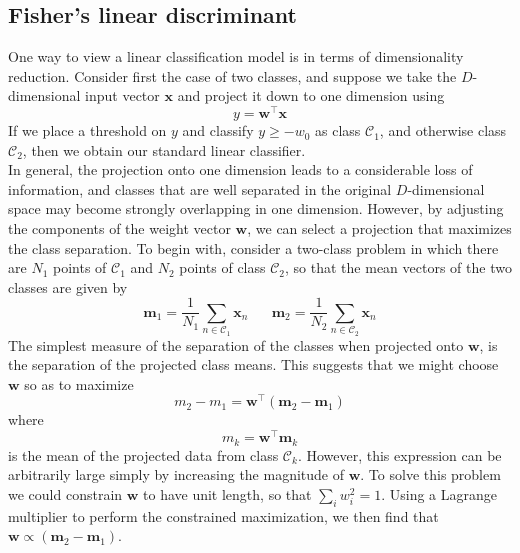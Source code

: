 \documentclass[twoside]{article}
\begin{document}
\subsection{Fisher’s linear discriminant}
One way to view a linear classification model is in terms of dimensionality reduction. Consider first the case of two classes, and suppose we take the $D$-dimensional input vector $\boldsymbol{x}$ and project it down to one dimension using
\begin{equation}
    y = \boldsymbol{w^\intercal x}
\end{equation}
If we place a threshold on $y$ and classify $y \geq -w_0$ as class $\mathcal{C}_1$, and otherwise class $\mathcal{C}_2$, then we obtain our standard linear classifier.\\
In general, the projection onto one dimension leads to a considerable loss of information, and classes that are well separated in the original $D$-dimensional space may become strongly overlapping in one dimension. However, by adjusting the components of the weight vector $\boldsymbol{w}$, we can select a projection that maximizes the class separation. To begin with, consider a two-class problem in which there are $N_1$ points of $\mathcal{C}_1$ and $N_2$ points of class $\mathcal{C}_2$, so that the mean vectors of the two classes are given by
\begin{equation*}
    \boldsymbol{m}_1 = \frac{1}{N_1}\sum\limits_{n \in \mathcal{C}_1} \boldsymbol{x}_n
    \hspace{20pt}
    \boldsymbol{m}_2 = \frac{1}{N_2}\sum\limits_{n \in \mathcal{C}_2} \boldsymbol{x}_n
\end{equation*}
The simplest measure of the separation of the classes when projected onto $\boldsymbol{w}$, is the separation of the projected class means. This suggests that we might choose $\boldsymbol{w}$ so as to maximize
\begin{equation*}
    m_2 - m_1 = \boldsymbol{w}^\intercal(\boldsymbol{m}_2 - \boldsymbol{m}_1)
\end{equation*}
where 
\begin{equation}
    m_k = \boldsymbol{w}^\intercal\boldsymbol{m}_k
\end{equation}
is the mean of the projected data from class $\mathcal{C}_k$. However, this expression can be arbitrarily large simply by increasing the magnitude of $\boldsymbol{w}$. To solve this problem we could constrain $\boldsymbol{w}$ to have unit length, so that $\sum_i w_i^2 = 1$. Using a Lagrange multiplier to perform the constrained maximization, we then find that $\boldsymbol{w} \propto (\boldsymbol{m}_2 - \boldsymbol{m}_1)$. \\
\end{document}
